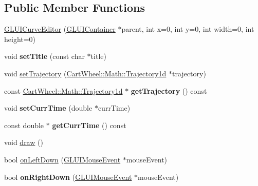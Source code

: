 \subsection*{Public Member Functions}
\begin{DoxyCompactItemize}
\item 
\hyperlink{classCartWheel_1_1GL_1_1GLUICurveEditor_aef6b132ecca4afe48d166193738d84a8}{GLUICurveEditor} (\hyperlink{classCartWheel_1_1GL_1_1GLUIContainer}{GLUIContainer} $\ast$parent, int x=0, int y=0, int width=0, int height=0)
\item 
\hypertarget{classCartWheel_1_1GL_1_1GLUICurveEditor_a34d828b8c424d1410d5a778cb46121f0}{
void {\bfseries setTitle} (const char $\ast$title)}
\label{classCartWheel_1_1GL_1_1GLUICurveEditor_a34d828b8c424d1410d5a778cb46121f0}

\item 
void \hyperlink{classCartWheel_1_1GL_1_1GLUICurveEditor_a6787e7d93f5e6ab2da85f5d8b675506e}{setTrajectory} (\hyperlink{classCartWheel_1_1Math_1_1GenericTrajectory}{CartWheel::Math::Trajectory1d} $\ast$trajectory)
\item 
\hypertarget{classCartWheel_1_1GL_1_1GLUICurveEditor_a581890eff9d2d9b66afc66e87e452d08}{
const \hyperlink{classCartWheel_1_1Math_1_1GenericTrajectory}{CartWheel::Math::Trajectory1d} $\ast$ {\bfseries getTrajectory} () const }
\label{classCartWheel_1_1GL_1_1GLUICurveEditor_a581890eff9d2d9b66afc66e87e452d08}

\item 
\hypertarget{classCartWheel_1_1GL_1_1GLUICurveEditor_a57651fc7b4c34a274f6ec031ed955342}{
void {\bfseries setCurrTime} (double $\ast$currTime)}
\label{classCartWheel_1_1GL_1_1GLUICurveEditor_a57651fc7b4c34a274f6ec031ed955342}

\item 
\hypertarget{classCartWheel_1_1GL_1_1GLUICurveEditor_a67c185e7e730314185d44664d01481be}{
const double $\ast$ {\bfseries getCurrTime} () const }
\label{classCartWheel_1_1GL_1_1GLUICurveEditor_a67c185e7e730314185d44664d01481be}

\item 
void \hyperlink{classCartWheel_1_1GL_1_1GLUICurveEditor_a04fa21f1c1f1c98e15f66da16b7f1b90}{draw} ()
\item 
bool \hyperlink{classCartWheel_1_1GL_1_1GLUICurveEditor_aba5a6d783d673d4a6e2ba0c2b305b2d8}{onLeftDown} (\hyperlink{classCartWheel_1_1GL_1_1GLUIMouseEvent}{GLUIMouseEvent} $\ast$mouseEvent)
\item 
\hypertarget{classCartWheel_1_1GL_1_1GLUICurveEditor_a93a666d5beef0d4c653d11ff3dbda766}{
bool {\bfseries onRightDown} (\hyperlink{classCartWheel_1_1GL_1_1GLUIMouseEvent}{GLUIMouseEvent} $\ast$mouseEvent)}
\label{classCartWheel_1_1GL_1_1GLUICurveEditor_a93a666d5beef0d4c653d11ff3dbda766}


\end{DoxyCompactItemize}
